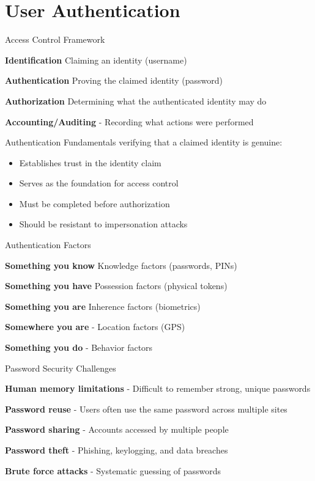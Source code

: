 \section{User Authentication}


\begin{definition}{Access Control Framework}

    \textbf{Identification} Claiming an identity (username)

    \textbf{Authentication} Proving the claimed identity (password)

    \textbf{Authorization} Determining what the authenticated identity may do

     \textbf{Accounting/Auditing} - Recording what actions were performed

\end{definition}

\begin{concept}{Authentication Fundamentals}
    verifying that a claimed identity is genuine:
\begin{itemize}
    \item Establishes trust in the identity claim
    \item Serves as the foundation for access control
    \item Must be completed before authorization
    \item Should be resistant to impersonation attacks
\end{itemize}
\end{concept}
\multend



\begin{definition}{Authentication Factors}

    \textbf{Something you know} Knowledge factors (passwords, PINs)

    \textbf{Something you have} Possession factors (physical tokens)

    \textbf{Something you are} Inherence factors (biometrics)

    \textbf{Somewhere you are} - Location factors (GPS)

     \textbf{Something you do} - Behavior factors 

\end{definition}


\begin{concept}{Password Security Challenges}

     \textbf{Human memory limitations} - Difficult to remember strong, unique passwords

     \textbf{Password reuse} - Users often use the same password across multiple sites

     \textbf{Password sharing} - Accounts accessed by multiple people

     \textbf{Password theft} - Phishing, keylogging, and data breaches

     \textbf{Brute force attacks} - Systematic guessing of passwords

\end{concept}



